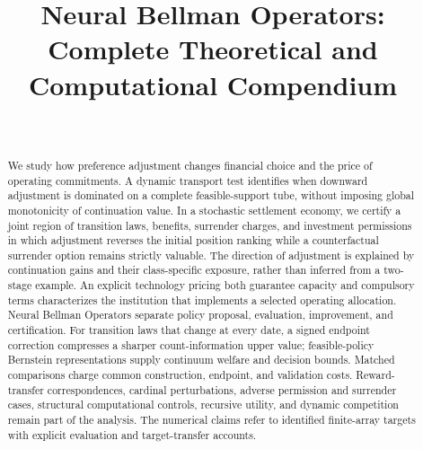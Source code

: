 \documentclass[ecta]{econsocart}
\begin{document}
\begin{frontmatter}
\title{Neural Bellman Operators: Complete Theoretical and Computational Compendium}
\begin{aug}
\author[id=au1,addressref={add1}]{~}
\address[id=add1]{,}
\end{aug}
\begin{abstract}
We study how preference adjustment changes financial choice and the price of operating commitments. A dynamic transport test identifies when downward adjustment is dominated on a complete feasible-support tube, without imposing global monotonicity of continuation value. In a stochastic settlement economy, we certify a joint region of transition laws, benefits, surrender charges, and investment permissions in which adjustment reverses the initial position ranking while a counterfactual surrender option remains strictly valuable. The direction of adjustment is explained by continuation gains and their class-specific exposure, rather than inferred from a two-stage example. An explicit technology pricing both guarantee capacity and compulsory terms characterizes the institution that implements a selected operating allocation. Neural Bellman Operators separate policy proposal, evaluation, improvement, and certification. For transition laws that change at every date, a signed endpoint correction compresses a sharper count-information upper value; feasible-policy Bernstein representations supply continuum welfare and decision bounds. Matched comparisons charge common construction, endpoint, and validation costs. Reward-transfer correspondences, cardinal perturbations, adverse permission and surrender cases, structural computational controls, recursive utility, and dynamic competition remain part of the analysis. The numerical claims refer to identified finite-array targets with explicit evaluation and target-transfer accounts.
\end{abstract}
\begin{keyword}
\end{keyword}
\end{frontmatter}
\end{document}
